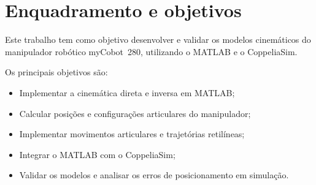 
\section{Enquadramento e objetivos}
\label{sec:enq-e-obj}

Este trabalho tem como objetivo desenvolver e validar os modelos cinemáticos do manipulador robótico myCobot~280, utilizando o MATLAB e o CoppeliaSim.

Os principais objetivos são:

\begin{itemize}
    \item Implementar a cinemática direta e inversa em MATLAB;
    \item Calcular posições e configurações articulares do manipulador;
    \item Implementar movimentos articulares e trajetórias retilíneas;
    \item Integrar o MATLAB com o CoppeliaSim;
    \item Validar os modelos e analisar os erros de posicionamento em simulação.
\end{itemize}
